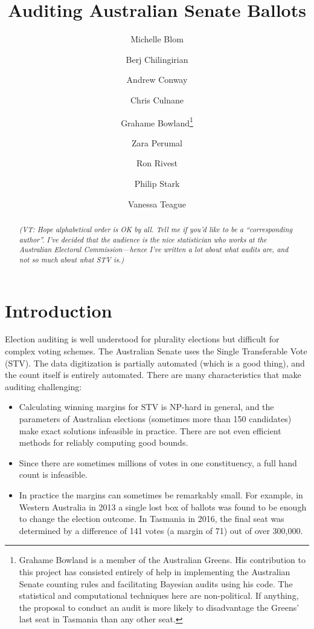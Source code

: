 \documentclass[10pt,a4paper]{article}
\newcommand{\VTNote}[1]{{\it(VT: #1)}}
\begin{document}
\title{Auditing Australian Senate Ballots}
\author{Michelle Blom \and  Berj Chilingirian \and  Andrew Conway \and Chris Culnane \and 
Grahame Bowland\thanks{Grahame Bowland is a member of the Australian Greens.  His contribution to this project has consisted entirely of help in implementing the Australian Senate counting rules and facilitating Bayesian audits using his code.  The statistical and computational techniques here are non-political.  If anything, the proposal to conduct an audit is more likely to disadvantage the Greens' last seat in Tasmania than any other seat.} \and Zara Perumal \and Ron Rivest 
 \and Philip Stark \and Vanessa Teague}
\maketitle

\tableofcontents

\begin{abstract}
\VTNote{Hope alphabetical order is OK by all.  Tell me if you'd like to be a ``corresponding author''.  I've decided that the audience is the nice statistician who works at the Australian Electoral Commission---hence I've written a lot about what audits are, and not so much about what STV is.}
\end{abstract}

\section{Introduction}
Election auditing is well understood for plurality elections but difficult for complex voting schemes.  The Australian Senate uses the Single Transferable Vote (STV).  The data digitization is partially automated (which is a good thing), and the count itself is entirely automated.  There are many characteristics that make auditing challenging:

\begin{itemize}
\item Calculating winning margins for STV is NP-hard in general, and the parameters of Australian elections (sometimes more than 150 candidates) make exact solutions infeasible in practice.  There are not even efficient methods for reliably computing good bounds. 	
\item Since there are sometimes millions of votes in one constituency, a full hand count is infeasible.
\item In practice the margins can sometimes be remarkably small.  For example, in Western Australia in 2013 a single lost box of ballots was found to be enough to change the election outcome.  In Tasmania in 2016, the final seat was determined by a difference of 141 votes 
(a margin of 71) out of over 300,000.	
\end{itemize}
\end{document}
